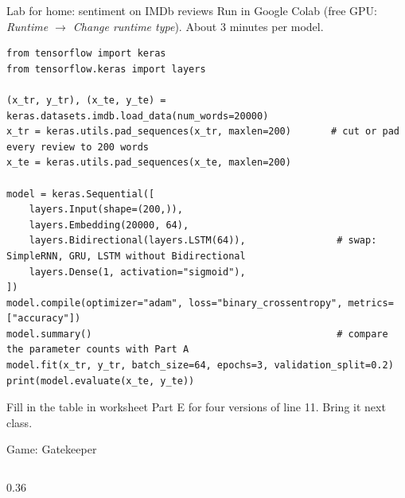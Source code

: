 \documentclass[aspectratio=169,10pt]{beamer}
\begin{document}
\begin{frame}[fragile]{Lab for home: sentiment on IMDb reviews}
  \small
  Run in Google Colab (free GPU: \emph{Runtime $\rightarrow$ Change runtime type}). About 3 minutes per model.
\begin{lstlisting}
from tensorflow import keras
from tensorflow.keras import layers

(x_tr, y_tr), (x_te, y_te) = keras.datasets.imdb.load_data(num_words=20000)
x_tr = keras.utils.pad_sequences(x_tr, maxlen=200)       # cut or pad every review to 200 words
x_te = keras.utils.pad_sequences(x_te, maxlen=200)

model = keras.Sequential([
    layers.Input(shape=(200,)),
    layers.Embedding(20000, 64),
    layers.Bidirectional(layers.LSTM(64)),                # swap: SimpleRNN, GRU, LSTM without Bidirectional
    layers.Dense(1, activation="sigmoid"),
])
model.compile(optimizer="adam", loss="binary_crossentropy", metrics=["accuracy"])
model.summary()                                           # compare the parameter counts with Part A
model.fit(x_tr, y_tr, batch_size=64, epochs=3, validation_split=0.2)
print(model.evaluate(x_te, y_te))
\end{lstlisting}
  Fill in the table in worksheet Part E for four versions of line 11. Bring it next class.
\end{frame}

\begin{frame}{Game: Gatekeeper}
  \begin{columns}[c]
    \begin{column}{0.36\textwidth}
      \centering
      \\[0.4em]
      {\scriptsize\ttfamily \gameurlshort}
    \end{column}
  \end{columns}
\end{frame}
\end{document}
